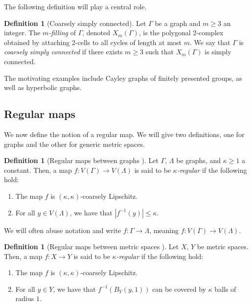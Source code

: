 \documentclass[11pt,a4paper]{amsart}
\theoremstyle{definition}
\newtheorem{definition}[theorem]{Definition}
\begin{document}
The following definition will play a central role.

\begin{definition}[Coarsely simply connected]\label{def:csc}
    Let $\Gamma$ be a graph and $m\geq 3$ an integer. The \emph{$m$-filling} of $\Gamma$, denoted $X_m(\Gamma)$, is the polygonal 2-complex obtained by attaching 2-cells to all cycles of length at most $m$. 
    We say that  $\Gamma$ is \emph{coarsely simply connected} if there exists $m \geq 3$ such that $X_m(\Gamma)$ is simply connected.
\end{definition}

The motivating examples include Cayley graphs of finitely presented groups, as well as hyperbolic graphs.



\subsection{Regular maps}\label{ssec:reg-maps}

We now define the notion of a regular map. We will give two definitions, one for graphs and the other for generic metric spaces. 

\begin{definition}[Regular maps between graphs \cite{benjamini2012separation}]\label{def:reg-map-graphs}
    Let $\Gamma$, $\Lambda$ be graphs, and $\kappa \geq 1$ a constant. Then, a map $f : V(\Gamma) \to V(\Lambda)$ is said to be \emph{$\kappa$-regular} if the following hold:
\begin{enumerate}
    \item The map $f$ is $(\kappa,\kappa)$-coarsely Lipschitz. 
    \item For all $y \in V(\Lambda)$, we have that $|f^{-1}(y)| \leq \kappa$. 
\end{enumerate}
\end{definition}

We will often abuse notation and write $f : \Gamma \to \Lambda$, meaning $f : V(\Gamma) \to V(\Lambda)$. 


\begin{definition}[Regular maps between metric spaces {\cite[Def.~1.3]{benjamini1996harmonic}}]\label{def:reg-map-spaces}
    Let $X$, $Y$ be metric spaces. 
    Then, a map $f : X \to Y$ is said to be \emph{$\kappa$-regular} if the following hold:
\begin{enumerate}
    \item The map $f$ is $(\kappa,\kappa)$-coarsely Lipschitz. 
    \item For all $y \in Y$, we have that $f^{-1}(B_Y(y,1))$ can be covered by $\kappa$ balls of radius $1$. 
\end{enumerate}
\end{definition}
\end{document}
